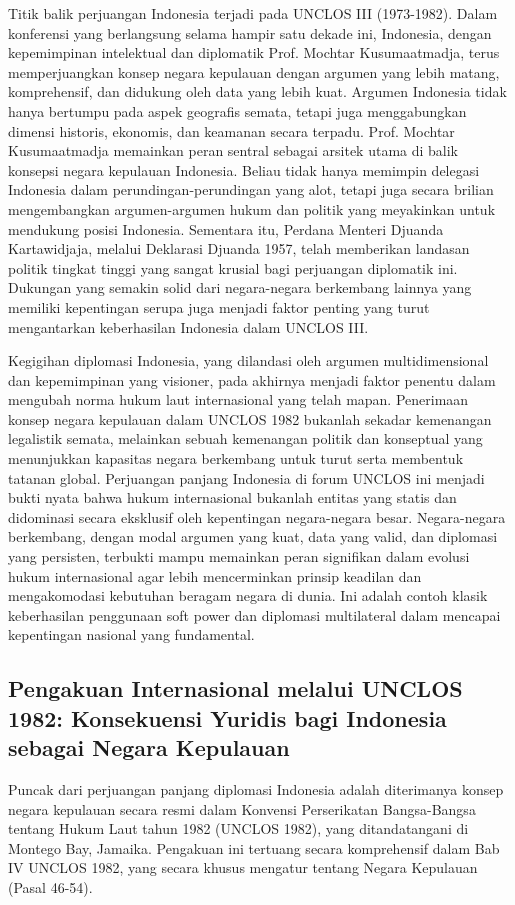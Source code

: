 \documentclass[12pt, a4paper]{article}
\begin{document}
Titik balik perjuangan Indonesia terjadi pada UNCLOS III (1973-1982). Dalam konferensi yang berlangsung selama hampir satu dekade ini, Indonesia, dengan kepemimpinan intelektual dan diplomatik Prof. Mochtar Kusumaatmadja, terus memperjuangkan konsep negara kepulauan dengan argumen yang lebih matang, komprehensif, dan didukung oleh data yang lebih kuat. Argumen Indonesia tidak hanya bertumpu pada aspek geografis semata, tetapi juga menggabungkan dimensi historis, ekonomis, dan keamanan secara terpadu. Prof. Mochtar Kusumaatmadja memainkan peran sentral sebagai arsitek utama di balik konsepsi negara kepulauan Indonesia. Beliau tidak hanya memimpin delegasi Indonesia dalam perundingan-perundingan yang alot, tetapi juga secara brilian mengembangkan argumen-argumen hukum dan politik yang meyakinkan untuk mendukung posisi Indonesia. Sementara itu, Perdana Menteri Djuanda Kartawidjaja, melalui Deklarasi Djuanda 1957, telah memberikan landasan politik tingkat tinggi yang sangat krusial bagi perjuangan diplomatik ini. Dukungan yang semakin solid dari negara-negara berkembang lainnya yang memiliki kepentingan serupa juga menjadi faktor penting yang turut mengantarkan keberhasilan Indonesia dalam UNCLOS III.  

Kegigihan diplomasi Indonesia, yang dilandasi oleh argumen multidimensional dan kepemimpinan yang visioner, pada akhirnya menjadi faktor penentu dalam mengubah norma hukum laut internasional yang telah mapan. Penerimaan konsep negara kepulauan dalam UNCLOS 1982 bukanlah sekadar kemenangan legalistik semata, melainkan sebuah kemenangan politik dan konseptual yang menunjukkan kapasitas negara berkembang untuk turut serta membentuk tatanan global. Perjuangan panjang Indonesia di forum UNCLOS ini menjadi bukti nyata bahwa hukum internasional bukanlah entitas yang statis dan didominasi secara eksklusif oleh kepentingan negara-negara besar. Negara-negara berkembang, dengan modal argumen yang kuat, data yang valid, dan diplomasi yang persisten, terbukti mampu memainkan peran signifikan dalam evolusi hukum internasional agar lebih mencerminkan prinsip keadilan dan mengakomodasi kebutuhan beragam negara di dunia. Ini adalah contoh klasik keberhasilan penggunaan soft power dan diplomasi multilateral dalam mencapai kepentingan nasional yang fundamental.
\subsection*{Pengakuan Internasional melalui UNCLOS 1982: Konsekuensi Yuridis bagi Indonesia sebagai Negara Kepulauan}
Puncak dari perjuangan panjang diplomasi Indonesia adalah diterimanya konsep negara kepulauan secara resmi dalam Konvensi Perserikatan Bangsa-Bangsa tentang Hukum Laut tahun 1982 (UNCLOS 1982), yang ditandatangani di Montego Bay, Jamaika. Pengakuan ini tertuang secara komprehensif dalam Bab IV UNCLOS 1982, yang secara khusus mengatur tentang Negara Kepulauan (Pasal 46-54).  
\end{document}
